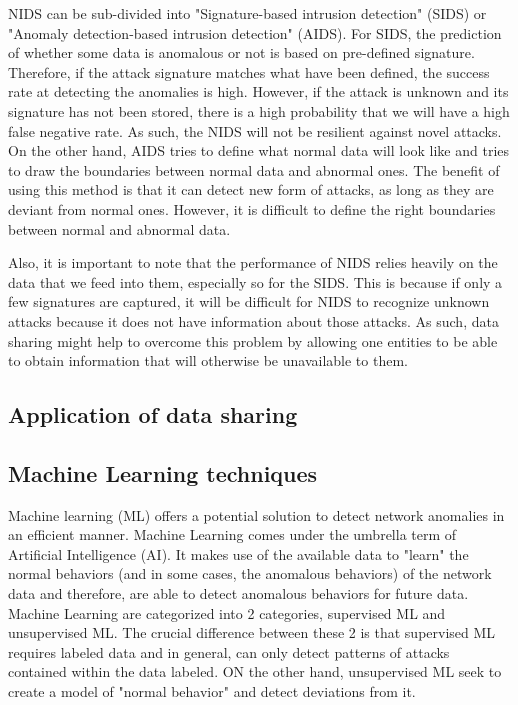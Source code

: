 \begin{background}
NIDS can be sub-divided into "Signature-based intrusion detection" (SIDS) or "Anomaly detection-based intrusion detection" (AIDS). For SIDS, the prediction of whether some data is anomalous or not is based on pre-defined signature. Therefore, if the attack signature matches what have been defined, the success rate at detecting the anomalies is high. However, if the attack is unknown and its signature has not been stored, there is a high probability that we will have a high false negative rate. As such, the NIDS will not be resilient against novel attacks. On the other hand, AIDS tries to define what normal data will look like and tries to draw the boundaries between normal data and abnormal ones. The benefit of using this method is that it can detect new form of attacks, as long as they are deviant from normal ones. However, it is difficult to define the right boundaries between normal and abnormal data.

Also, it is important to note that the performance of NIDS relies heavily on the data that we feed into them, especially so for the SIDS. This is because if only a few signatures are captured, it will be difficult for NIDS to recognize unknown attacks because it does not have information about those attacks. As such, data sharing might help to overcome this problem by allowing one entities to be able to obtain information that will otherwise be unavailable to them.


\subsection{Application of data sharing}



\subsection{Machine Learning techniques}
Machine learning (ML) offers a potential solution to detect network anomalies in an efficient manner. Machine Learning comes under the umbrella term of Artificial Intelligence (AI). It makes use of the available data to "learn" the normal behaviors (and in some cases, the anomalous behaviors) of the network data and therefore, are able to detect anomalous behaviors for future data. 
Machine Learning are categorized into 2 categories, supervised ML and unsupervised ML. The crucial difference between these 2 is that supervised ML requires labeled data and in general, can only detect patterns of attacks contained within the data labeled. ON the other hand, unsupervised ML seek to create a model of "normal behavior" and detect deviations from it.


\end{background}
